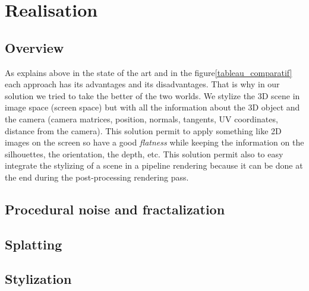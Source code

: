 \chapter{Realisation}


\section{Overview}

As explains above in the state of the art and in the figure\ref{tableau_comparatif} each approach has its advantages and its disadvantages. That is why in our solution we tried to take the better of the two worlds. We stylize the 3D scene in image space (screen space) but with all the information about the 3D object and the camera (camera matrices, position, normals, tangents, UV coordinates, distance from the camera). This solution permit to apply something like 2D images on the screen so have a good \textit{flatness} while keeping the information on the silhouettes, the orientation, the depth, etc. This solution permit also to easy integrate the stylizing of a scene in a pipeline rendering because it can be done at the end during the post-processing rendering pass.



\section{Procedural noise and fractalization}

\section{Splatting}


\section{Stylization}
